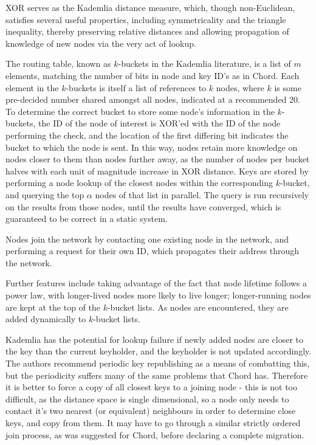 \documentclass[10pt, a4paper]{article}
\begin{document}
XOR serves as the Kademlia distance measure, which, though non-Euclidean, satisfies several useful properties, including symmetricality and the triangle inequality, thereby preserving relative distances and allowing propagation of knowledge of new nodes via the very act of lookup.

The routing table, known as $k$-buckets in the Kademlia literature, is a list of $m$ elements, matching the number of bits in node and key ID's as in Chord.
Each element in the $k$-buckets is itself a list of references to $k$ nodes, where $k$ is some pre-decided number shared amongst all nodes, indicated at a recommended 20.
To determine the correct bucket to store some node's information in the $k$-buckets, the ID of the node of interest is XOR'ed with the ID of the node performing the check, and the location of the first differing bit indicates the bucket to which the node is sent.
In this way, nodes retain more knowledge on nodes closer to them than nodes further away, as the number of nodes per bucket halves with each unit of magnitude increase in XOR distance.
Keys are stored by performing a node lookup of the closest nodes within the corresponding $k$-bucket, and querying the top $\alpha$ nodes of that list in parallel.
The query is run recursively on the results from those nodes, until the results have converged, which is guaranteed to be correct in a static system.

Nodes join the network by contacting one existing node in the network, and performing a request for their own ID, which propagates their address through the network.

Further features include taking advantage of the fact that node lifetime follows a power law, with longer-lived nodes more lkely to live longer; longer-running nodes are kept at the top of the $k$-bucket lists.
As nodes are encountered, they are added dynamically to $k$-bucket lists.

Kademlia has the potential for lookup failure if newly added nodes are closer to the key than the current keyholder, and the keyholder is not updated accordingly.
The authors recommend periodic key republishing as a means of combatting this, but the periodicity suffers many of the same problems that Chord has.
Therefore it is better to force a copy of all closest keys to a joining node - this is not too difficult, as the distance space is single dimensional, so a node only needs to contact it's two nearest (or equivalent) neighbours in order to determine close keys, and copy from them.
It may have to go through a similar strictly ordered join process, as was suggested for Chord, before declaring a complete migration.
\end{document}
